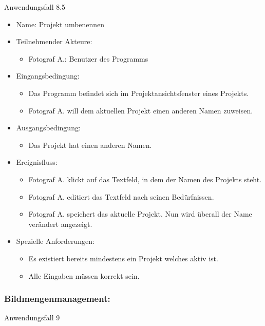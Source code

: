 \begin{itemize}
	\begin{description}
\item[Anwendungsfall 8.5]
\end{description}
 
\begin{itemize}
\item Name: Projekt umbenennen
\item Teilnehmender Akteure:
\begin{itemize}
\item Fotograf A.: Benutzer des Programms
\end{itemize}
\item Eingangsbedingung:
\begin{itemize}
\item Das Programm befindet sich im Projektansichtsfenster eines Projekts.
\item Fotograf A. will dem aktuellen Projekt einen anderen Namen zuweisen.
\end{itemize}
\item Ausgangsbedingung:
\begin{itemize}
\item Das Projekt hat einen anderen Namen.
\end{itemize}
\item Ereignisfluss:
\begin{itemize}
\item Fotograf A. klickt auf das Textfeld, in dem der Namen des Projekts steht.
\item Fotograf A. editiert das Textfeld nach seinen Bedürfnissen.
\item Fotograf A. speichert das aktuelle Projekt. Nun wird überall der Name verändert angezeigt.
\end{itemize}
\item Spezielle Anforderungen:
\begin{itemize}
\item Es existiert bereits mindestens ein Projekt welches aktiv ist.
\item Alle Eingaben müssen korrekt sein.
\end{itemize}
\end{itemize}

	\subsubsection{Bildmengenmanagement:}
	
	\begin{description}
		\item[Anwendungsfall 9]
	\end{description}
	

\end{itemize}
